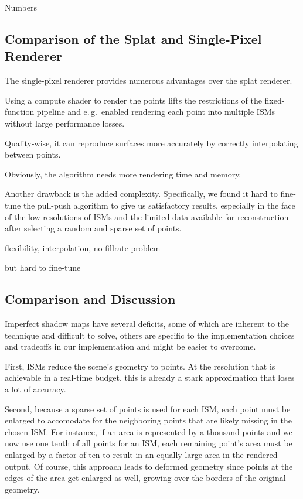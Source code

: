  Numbers


 \subsection {Comparison of the Splat and Single-Pixel Renderer}

 The single-pixel renderer provides numerous advantages over the splat renderer.

 Using a compute shader to render the points lifts the restrictions of the fixed-function pipeline and e.\,g.\ enabled rendering each point into multiple ISMs without large performance losses.

 Quality-wise, it can reproduce surfaces more accurately by correctly interpolating between points.

 Obviously, the algorithm needs more rendering time and memory.



 Another drawback is the added complexity. Specifically, we found it hard to fine-tune the pull-push algorithm to give us satisfactory results, especially in the face of the low resolutions of ISMs and the limited data available for reconstruction after selecting a random and sparse set of points.

 flexibility, interpolation, no fillrate problem

 but hard to fine-tune



 \subsection{Comparison and Discussion}


 Imperfect shadow maps have several deficits, some of which are inherent to the technique and difficult to solve, others are specific to the implementation choices and tradeoffs in our implementation and might be easier to overcome.

 First, ISMs reduce the scene's geometry to points. At the resolution that is achievable in a real-time budget, this is already a stark approximation that loses a lot of accuracy.

 Second, because a sparse set of points is used for each ISM, each point must be enlarged to accomodate for the neighboring points that are likely missing in the chosen ISM. For instance, if an area is represented by a thousand points and we now use one tenth of all points for an ISM, each remaining point's area must be enlarged by a factor of ten to result in an equally large area in the rendered output. Of course, this approach leads to deformed geometry since points at the edges of the area get enlarged as well, growing over the borders of the original geometry.

